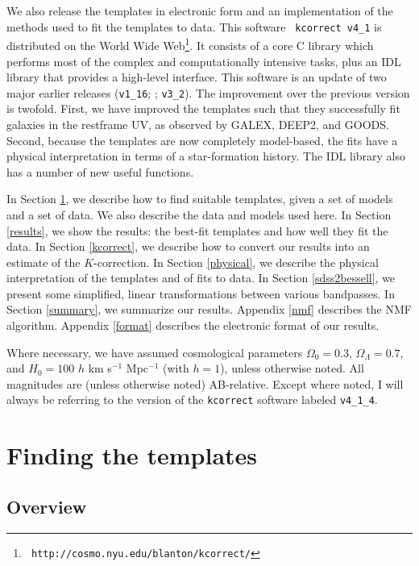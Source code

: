 \documentclass[12pt,preprint]{aastex}
\begin{document}
We also release the templates in electronic form and an implementation
of the methods used to fit the templates to data. This software {\tt
kcorrect v4\_1} is distributed on the World Wide Web{\footnote {\tt
http://cosmo.nyu.edu/blanton/kcorrect/}}. It consists of a core C
library which performs most of the complex and computationally
intensive tasks, plus an IDL library that provides a high-level
interface.  This software is an update of two major earlier releases
({\tt v1\_16}; \citealt{blanton03b}; {\tt v3\_2}). The improvement
over the previous version is twofold. First, we have improved the
templates such that they successfully fit galaxies in the restframe
UV, as observed by GALEX, DEEP2, and GOODS. Second, because the
templates are now completely model-based, the fits have a physical
interpretation in terms of a star-formation history. The IDL library
also has a number of new useful functions.

In Section \ref{algorithm}, we describe how to find suitable
templates, given a set of models and a set of data. We also describe
the data and models used here. In Section \ref{results}, we show the
results: the best-fit templates and how well they fit the data.  In
Section \ref{kcorrect}, we describe how to convert our results into an
estimate of the $K$-correction. In Section \ref{physical}, we describe
the physical interpretation of the templates and of fits to data.  In
Section \ref{sdss2bessell}, we present some simplified, linear
transformations between various bandpasses. In Section \ref{summary},
we summarize our results. Appendix \ref{nmf} describes the NMF
algorithm.  Appendix \ref{format} describes the electronic format of
our results.

Where necessary, we have assumed cosmological parameters $\Omega_0 =
0.3$, $\Omega_\Lambda = 0.7$, and $H_0 = 100$ $h$ km s$^{-1}$
Mpc$^{-1}$ (with $h=1$), unless otherwise noted. All magnitudes are
(unless otherwise noted) AB-relative.  Except where noted, I will
always be referring to the version of the {\tt kcorrect} software
labeled {\tt v4\_1\_4}.

\section{Finding the templates}
\label{algorithm}

\subsection{Overview}
\end{document}
